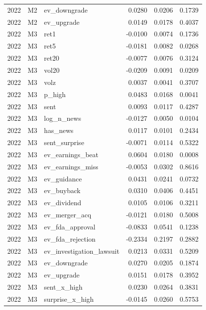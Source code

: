 \begin{tabular}{rllrrr}
2022 & M2 & ev\_downgrade & 0.0280 & 0.0206 & 0.1739 \\
2022 & M2 & ev\_upgrade & 0.0149 & 0.0178 & 0.4037 \\
2022 & M3 & ret1 & -0.0100 & 0.0074 & 0.1736 \\
2022 & M3 & ret5 & -0.0181 & 0.0082 & 0.0268 \\
2022 & M3 & ret20 & -0.0077 & 0.0076 & 0.3124 \\
2022 & M3 & vol20 & -0.0209 & 0.0091 & 0.0209 \\
2022 & M3 & volz & 0.0037 & 0.0041 & 0.3707 \\
2022 & M3 & p\_high & 0.0483 & 0.0168 & 0.0041 \\
2022 & M3 & sent & 0.0093 & 0.0117 & 0.4287 \\
2022 & M3 & log\_n\_news & -0.0127 & 0.0050 & 0.0104 \\
2022 & M3 & has\_news & 0.0117 & 0.0101 & 0.2434 \\
2022 & M3 & sent\_surprise & -0.0071 & 0.0114 & 0.5322 \\
2022 & M3 & ev\_earnings\_beat & 0.0604 & 0.0180 & 0.0008 \\
2022 & M3 & ev\_earnings\_miss & -0.0053 & 0.0302 & 0.8616 \\
2022 & M3 & ev\_guidance & 0.0431 & 0.0241 & 0.0732 \\
2022 & M3 & ev\_buyback & 0.0310 & 0.0406 & 0.4451 \\
2022 & M3 & ev\_dividend & 0.0105 & 0.0106 & 0.3211 \\
2022 & M3 & ev\_merger\_acq & -0.0121 & 0.0180 & 0.5008 \\
2022 & M3 & ev\_fda\_approval & -0.0833 & 0.0541 & 0.1238 \\
2022 & M3 & ev\_fda\_rejection & -0.2334 & 0.2197 & 0.2882 \\
2022 & M3 & ev\_investigation\_lawsuit & 0.0213 & 0.0331 & 0.5209 \\
2022 & M3 & ev\_downgrade & 0.0270 & 0.0205 & 0.1874 \\
2022 & M3 & ev\_upgrade & 0.0151 & 0.0178 & 0.3952 \\
2022 & M3 & sent\_x\_high & 0.0230 & 0.0264 & 0.3831 \\
2022 & M3 & surprise\_x\_high & -0.0145 & 0.0260 & 0.5753 \\
\bottomrule
\end{tabular}
